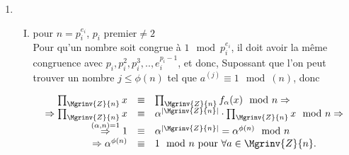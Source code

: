 {\begin{enumerate}
\begin{equation*}
\begin{array}{rcl}
					\Rightarrow \prod_{\Mgrinv{Z}{n}} x      &\equiv& \alpha^{|\Mgrinv{Z}{n}|}\cdot\prod_{\Mgrinv{Z}{n}}x \mod{n} \Rightarrow\\
					\stackrel{(\alpha,n) = 1}{\Rightarrow} 1 &\equiv& \alpha^{|\Mgrinv{Z}{n}|} =  \alpha^{\phi(n)}\mod{n} \\
					\Rightarrow \alpha^{\phi(n)}             &\equiv& 1 \mod{n}\text{ pour }\forall a \in \Mgrinv{Z}{n}.
				\end{array}
			\end{equation*}
		\item \begin{enumerate}[I.]
				\item pour $n = p_i^{e_i}$, $p_i\text{ premier} \neq 2$ \\
					Pour qu'un nombre soit congrue à $1 \mod{p_i^{e_i}}$, il doit avoir la même congruence avec $p_i,p_i^2,p_i^3,..,e_i^{p_i-1}$, et donc, 
					Supossant que l'on peut trouver un nombre $j \leq \phi(n)$ tel que $a^(j) \equiv 1 \mod(n)$, donc 
						
				\begin{equation*}
					\begin{array}{rcl}
						\prod_{\Mgrinv{Z}{n}} x                  &\equiv& \prod_{\Mgrinv{Z}{n}} f_{\alpha}(x) \mod{n} \Rightarrow \\
						\Rightarrow \prod_{\Mgrinv{Z}{n}} x      &\equiv& \alpha^{|\Mgrinv{Z}{n}|}\cdot\prod_{\Mgrinv{Z}{n}}x \mod{n} \Rightarrow\\
						\stackrel{(\alpha,n) = 1}{\Rightarrow} 1 &\equiv& \alpha^{|\Mgrinv{Z}{n}|} =  \alpha^{\phi(n)}\mod{n} \\
						\Rightarrow \alpha^{\phi(n)}             &\equiv& 1 \mod{n}\text{ pour }\forall a \in \Mgrinv{Z}{n}.
					\end{array}
				\end{equation*}
				
			\end{enumerate}
	\end{enumerate}}




